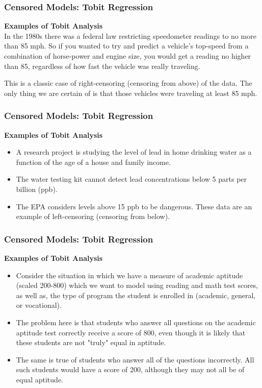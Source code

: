 \documentclass{beamer}
\begin{document}
\begin{frame}
	\frametitle{Censored Models: Tobit Regression}
	\large
	\textbf{Examples of Tobit Analysis}\\
	In the 1980s there was a federal law restricting speedometer readings to no more than 85 mph. So if you wanted to try and predict a vehicle's top-speed from a combination of horse-power and engine size, you would get a reading no higher than 85, regardless of how fast the vehicle was really traveling. 
	
	This is a classic case of right-censoring (censoring from above) of the data. The only thing we are certain of is that those vehicles were traveling at least 85 mph.
\end{frame}
\begin{frame}
	\frametitle{Censored Models: Tobit Regression}
	\large
	\textbf{Examples of Tobit Analysis}
	\begin{itemize}
\item 	A research project is studying the level of lead in home drinking water as a function of the age of a house and family income. 
\item The water testing kit cannot detect lead concentrations below 5 parts per billion (ppb). 
\item	
	The EPA considers levels above 15 ppb to be dangerous. These data are an example of left-censoring (censoring from below).
	\end{itemize}

\end{frame}
\begin{frame}[fragile]
		\frametitle{Censored Models: Tobit Regression}
		\large
		\textbf{Examples of Tobit Analysis}\\
		\begin{itemize}

\item Consider the situation in which we have a measure of academic aptitude (scaled 200-800) which we want to model using reading and math test scores, as well as, the type of program the student is enrolled in (academic, general, or vocational). 
\item The problem here is that students who answer all questions on the academic aptitude test correctly receive a score of 800, even though it is likely that these students are not "truly" equal in aptitude. 
\item The same is true of students who answer all of the questions incorrectly. All such students would have a score of 200, although they may not all be of equal aptitude.
		\end{itemize}
	
\end{frame}
\end{document}
